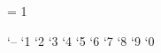 \XeTeXinterchartokenstate = 1
\newXeTeXintercharclass \charHalbgeviert
\newXeTeXintercharclass \charNummerEins
\newXeTeXintercharclass \charNummerZwei
\newXeTeXintercharclass \charNummerDrei
\newXeTeXintercharclass \charNummerVier
\newXeTeXintercharclass {}
\newXeTeXintercharclass \charNummerSechs
\newXeTeXintercharclass \charNummerSieben
\newXeTeXintercharclass \charNummerAcht
\newXeTeXintercharclass \charNummerNeun
\newXeTeXintercharclass \charNummerNull

\newXeTeXintercharclass \charKomma
\newXeTeXintercharclass \charGui
\newXeTeXintercharclass \charPunkt
\newXeTeXintercharclass \charSlash
\newXeTeXintercharclass \charParens
\newXeTeXintercharclass \charDivis
\newXeTeXintercharclass \charKzg
\newXeTeXintercharclass \charColon

\newXeTeXintercharclass \chara
\newXeTeXintercharclass \charb
\newXeTeXintercharclass \charc
\newXeTeXintercharclass \chard
\newXeTeXintercharclass \chare
\newXeTeXintercharclass \charf
\newXeTeXintercharclass \charg
\newXeTeXintercharclass \charh
\newXeTeXintercharclass \chari
\newXeTeXintercharclass \chark
\newXeTeXintercharclass \charl
\newXeTeXintercharclass \charm
\newXeTeXintercharclass \charn
\newXeTeXintercharclass \charo
\newXeTeXintercharclass \charp
\newXeTeXintercharclass \charq
\newXeTeXintercharclass \charr
\newXeTeXintercharclass \chars
\newXeTeXintercharclass \chart
\newXeTeXintercharclass \charu
\newXeTeXintercharclass \charv
\newXeTeXintercharclass \charw
\newXeTeXintercharclass \charx
\newXeTeXintercharclass \chary
\newXeTeXintercharclass \charz

\newXeTeXintercharclass \charA
\newXeTeXintercharclass \charB
\newXeTeXintercharclass \charC
\newXeTeXintercharclass \charD
\newXeTeXintercharclass \charE
\newXeTeXintercharclass \charF
\newXeTeXintercharclass \charG
\newXeTeXintercharclass \charH
\newXeTeXintercharclass \charI
\newXeTeXintercharclass \charJ
\newXeTeXintercharclass \charK
\newXeTeXintercharclass \charL
\newXeTeXintercharclass \charM
\newXeTeXintercharclass \charN
\newXeTeXintercharclass \charO
\newXeTeXintercharclass \charP
\newXeTeXintercharclass \charQ
\newXeTeXintercharclass \charR
\newXeTeXintercharclass \charS
\newXeTeXintercharclass \charT
\newXeTeXintercharclass \charV
\newXeTeXintercharclass \charW
\newXeTeXintercharclass \charX
\newXeTeXintercharclass \charZ

\XeTeXcharclass `– \charHalbgeviert
\XeTeXcharclass `1 \charNummerEins
\XeTeXcharclass `2 \charNummerZwei
\XeTeXcharclass `3 \charNummerDrei
\XeTeXcharclass `4 \charNummerVier
\XeTeXcharclass `5 
\XeTeXcharclass `6 \charNummerSechs
\XeTeXcharclass `7 \charNummerSieben
\XeTeXcharclass `8 \charNummerAcht
\XeTeXcharclass `9 \charNummerNeun
\XeTeXcharclass `0 \charNummerNull

